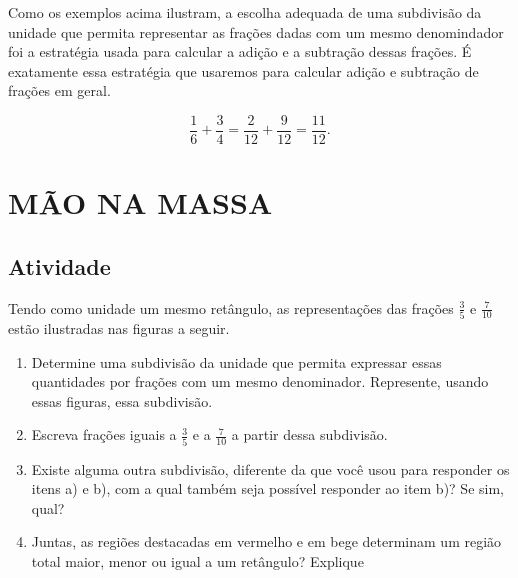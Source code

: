 \documentclass[a4,12pt]{book}
\begin{document}
Como os exemplos acima ilustram, a escolha adequada de uma subdivisão da unidade que permita representar as frações dadas com um mesmo denomindador foi a estratégia usada para calcular a adição e a subtração dessas frações. É exatamente essa estratégia que usaremos para calcular adição e subtração de frações em geral. 

$$\dfrac{1}{6} + \dfrac{3}{4} = \dfrac{2}{12} + \dfrac{9}{12} = \dfrac{11}{12}.$$


\section{MÃO NA MASSA }

\subsection{Atividade}

Tendo como unidade um mesmo retângulo, as representações das frações $\frac{3}{5}$ e $\frac{7}{10}$ estão ilustradas nas figuras a seguir. 

\begin{center}
\end{center}

\begin{enumerate} [\quad a)] %
  \item     Determine uma subdivisão da unidade que permita expressar essas quantidades por frações com um mesmo denominador. Represente, usando essas figuras, essa subdivisão.
  \item     Escreva frações iguais a     $\frac{3}{5}$     e a     $\frac{7}{10}$     a partir dessa subdivisão.
  \item     Existe alguma outra subdivisão, diferente da que você usou para responder os itens a) e b), com a qual também seja possível responder ao item b)? Se sim, qual? 
  \item     Juntas, as regiões destacadas em vermelho e em bege determinam um região total maior, menor ou igual a um retângulo? Explique
\end{enumerate} %
\end{document}
